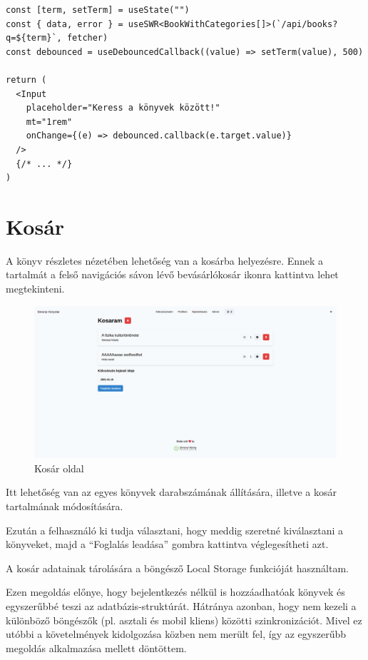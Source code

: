 \begin{lstlisting}[caption=A keresést megvalósító kódrészlet a frontenden]
const [term, setTerm] = useState("")
const { data, error } = useSWR<BookWithCategories[]>(`/api/books?q=${term}`, fetcher)
const debounced = useDebouncedCallback((value) => setTerm(value), 500)

return (
  <Input
    placeholder="Keress a könyvek között!"
    mt="1rem"
    onChange={(e) => debounced.callback(e.target.value)}
  />
  {/* ... */}
)
\end{lstlisting}

\section{Kosár}

A könyv részletes nézetében lehetőség van a kosárba helyezésre. Ennek a tartalmát a felső navigációs sávon lévő bevásárlókosár
ikonra kattintva lehet megtekinteni.

\begin{figure}[!ht]
  \centering
  \includegraphics[width=150mm, keepaspectratio]{figures/cart.png}
  \caption{Kosár oldal}
  \label{fig:CartPage}
\end{figure}

Itt lehetőség van az egyes könyvek darabszámának állítására, illetve a kosár tartalmának módosítására.

Ezután a felhasználó ki tudja választani, hogy meddig szeretné kiválasztani a könyveket, majd a ``Foglalás leadása'' gombra kattintva
véglegesítheti azt.

A kosár adatainak tárolására a böngésző Local Storage funkcióját használtam.

Ezen megoldás előnye, hogy bejelentkezés nélkül is hozzáadhatóak könyvek és egyszerűbbé teszi az adatbázis-struktúrát.
Hátránya azonban, hogy nem kezeli a különböző böngészők (pl. asztali és mobil kliens) közötti szinkronizációt. Mivel ez utóbbi a
követelmények kidolgozása közben nem merült fel, így az egyszerűbb megoldás alkalmazása mellett döntöttem.

